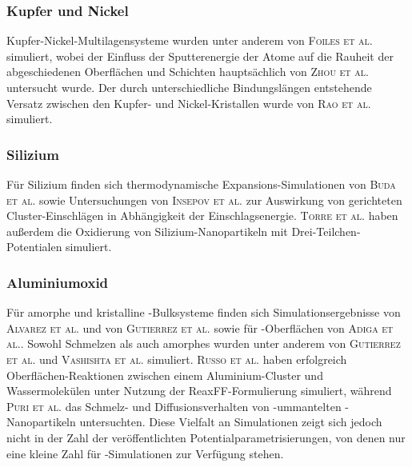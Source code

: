 \subsubsection{Kupfer und Nickel}
Kupfer-Nickel-Multilagensysteme wurden unter anderem von \textsc{Foiles et al.}\cite{foiles_calculation_1985} simuliert, wobei der Einfluss der Sputterenergie der Atome auf die Rauheit der abgeschiedenen Oberflächen und Schichten hauptsächlich von \textsc{Zhou et al.}\cite{zhou_atomistic_1998} untersucht wurde.
Der durch unterschiedliche Bindungslängen entstehende Versatz zwischen den Kupfer- und Nickel-Kristallen wurde von \textsc{Rao et al.}\cite{rao_atomistic_2000} simuliert.

\subsubsection{Silizium}
Für Silizium finden sich thermodynamische Expansions-Simulationen von \textsc{Buda et al.}\cite{buda_thermal_1990} sowie Untersuchungen von \textsc{Insepov et al.}\cite{insepov_molecular_1995} zur Auswirkung von gerichteten Cluster-Einschlägen in Abhängigkeit der Einschlagsenergie.
\textsc{Torre et al.}\cite{torre_study_2002} haben außerdem die Oxidierung von Silizium-Nanopartikeln mit Drei-Teilchen-Potentialen simuliert.

\subsubsection{Aluminiumoxid}
Für amorphe und kristalline -Bulksysteme finden sich Simulationsergebnisse von \textsc{Alvarez et al.}\cite{alvarez_computer_1995,alvarez_molecular_1992} und von \textsc{Gutierrez et al.}\cite{gutierrez_molecular_2002} sowie für -Oberflächen von \textsc{Adiga et al.}\cite{adiga_atomistic_2006}.
Sowohl Schmelzen als auch amorphes  wurden unter anderem von \textsc{Gutierrez et al.}\cite{gutierrez_structural_2000} und \textsc{Vashishta et al.}\cite{vashishta_interaction_2008} simuliert.
\textsc{Russo et al.}\cite{russo_molecular_2011} haben erfolgreich Oberflächen-Reaktionen zwischen einem Aluminium-Cluster und Wassermolekülen unter Nutzung der ReaxFF-Formulierung simuliert, während \textsc{Puri et al.}\cite{puri_thermo-mechanical_2010} das Schmelz- und Diffusionsverhalten von -ummantelten -Nanopartikeln untersuchten.
Diese Vielfalt an Simulationen zeigt sich jedoch nicht in der Zahl der veröffentlichten Potentialparametrisierungen, von denen nur eine kleine Zahl für -Simulationen zur Verfügung stehen.

